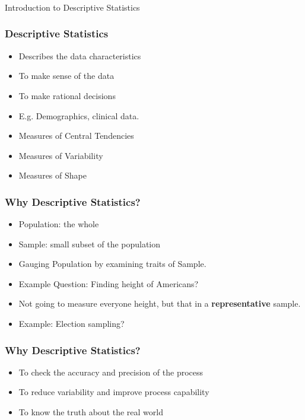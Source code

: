 \begin{frame}[fragile]\frametitle{}
\begin{center}
{\Large Introduction to Descriptive Statistics}
\end{center}
\end{frame}


\begin{frame}[fragile]\frametitle{Descriptive Statistics}
\begin{itemize}
\item Describes the data characteristics
\item To make sense of the data
\item To make rational decisions
\item E.g. Demographics, clinical data.
\item Measures of Central Tendencies
\item Measures of Variability
\item Measures of Shape
\end{itemize}
\end{frame}

\begin{frame}[fragile]\frametitle{Why Descriptive Statistics?}
\begin{itemize}
\item Population: the whole
\item Sample: small subset of the population
\item Gauging Population by examining traits of Sample.
\item Example Question: Finding height of Americans?
\item Not going to measure everyone height, but that in a {\bf representative} sample.
\item Example: Election sampling?
\end{itemize}
\end{frame}



\begin{frame}[fragile]\frametitle{Why Descriptive Statistics?}
\begin{itemize}
\item To check the accuracy and precision of the process
\item To reduce variability and improve process capability
\item To know the truth about the real world
\end{itemize}
\end{frame}


